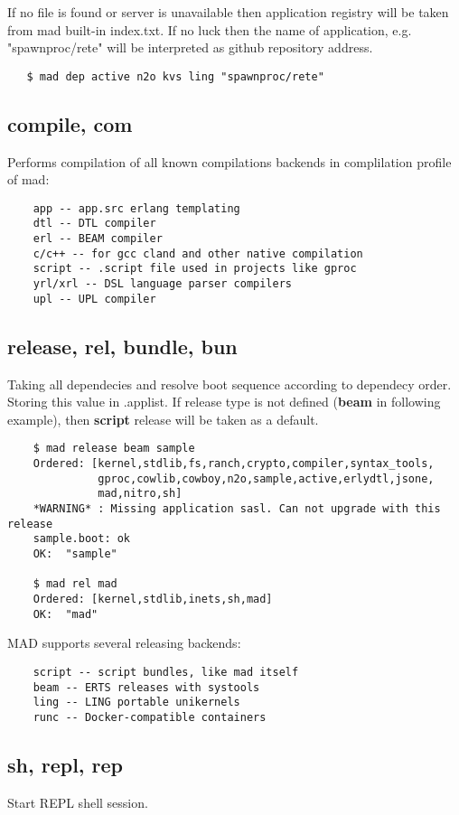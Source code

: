 If no file is found or server is unavailable then application registry will
be taken from mad built-in index.txt. If no luck then the name of application,
e.g. "spawnproc/rete" will be interpreted as github repository address.

\vspace{1\baselineskip}
\begin{lstlisting}
   $ mad dep active n2o kvs ling "spawnproc/rete"
\end{lstlisting}
\vspace{1\baselineskip}

\subsection{compile, com}
Performs compilation of all known compilations backends in complilation profile of mad:
\vspace{1\baselineskip}
\begin{lstlisting}
    app -- app.src erlang templating
    dtl -- DTL compiler
    erl -- BEAM compiler
    c/c++ -- for gcc cland and other native compilation
    script -- .script file used in projects like gproc
    yrl/xrl -- DSL language parser compilers
    upl -- UPL compiler
\end{lstlisting}
\vspace{1\baselineskip}

\subsection{release, rel, bundle, bun}
Taking all dependecies and resolve boot sequence according to dependecy order.
Storing this value in .applist. If release type is not defined ({\bf beam} in following example),
then {\bf script} release will be taken as a default.
\vspace{1\baselineskip}
\begin{lstlisting}
    $ mad release beam sample
    Ordered: [kernel,stdlib,fs,ranch,crypto,compiler,syntax_tools,
              gproc,cowlib,cowboy,n2o,sample,active,erlydtl,jsone,
              mad,nitro,sh]
    *WARNING* : Missing application sasl. Can not upgrade with this release
    sample.boot: ok
    OK:  "sample"

    $ mad rel mad
    Ordered: [kernel,stdlib,inets,sh,mad]
    OK:  "mad"
\end{lstlisting}
\vspace{1\baselineskip}

MAD supports several releasing backends:

\vspace{1\baselineskip}
\begin{lstlisting}
    script -- script bundles, like mad itself
    beam -- ERTS releases with systools
    ling -- LING portable unikernels
    runc -- Docker-compatible containers
\end{lstlisting}
\vspace{1\baselineskip}

\subsection{sh, repl, rep}

Start REPL shell session.
